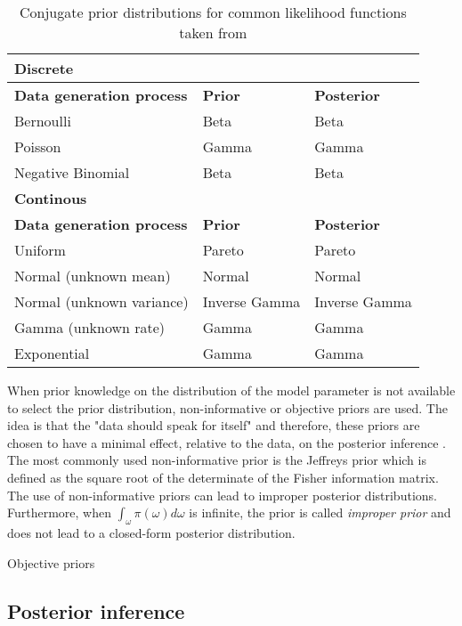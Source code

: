 \begin{table}[hb	]
\centering
\caption{Conjugate prior distributions for common likelihood functions taken from \citep{Fink1997}}
\label{tab0:priors}
\begin{tabular}{l l l}
\toprule
\textbf{Discrete} & &\\
\midrule
\midrule
\textbf{Data generation process} & \textbf{Prior} & \textbf{Posterior} \\ 
\midrule 
Bernoulli & Beta & Beta \\
Poisson & Gamma  & Gamma \\
Negative Binomial & Beta & Beta \\
\midrule
\midrule
\textbf{Continous} & & \\
\midrule
\midrule
\textbf{Data generation process} & \textbf{Prior} & \textbf{Posterior} \\ 
\midrule
Uniform  & Pareto & Pareto \\ 
Normal (unknown mean) &  Normal  & Normal \\ 
Normal (unknown variance) &  Inverse Gamma  & Inverse Gamma \\ 
Gamma (unknown rate) &  Gamma  & Gamma \\ 
Exponential &  Gamma  & Gamma \\ 
\bottomrule
\end{tabular}
\end{table} 

When prior knowledge on the distribution of the model parameter is not available to select the prior distribution, non-informative or objective priors are used. The idea is that the "data should speak for itself" and therefore, these priors are chosen to have a minimal effect, relative to the data, on the posterior inference \citep{Bernardo2000}. The most commonly used non-informative prior is the Jeffreys prior \citep{Jeffreys1946} which is defined as the square root of the determinate of the Fisher information matrix. The use of non-informative priors can lead to improper posterior distributions. Furthermore, when $\int_\omega\pi(\omega)d\omega$ is infinite, the prior is called \emph{improper prior} and does not lead to a closed-form posterior distribution.
 

Objective priors



\subsection{Posterior inference}

